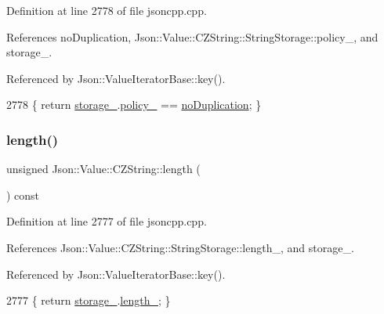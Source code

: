 Definition at line 2778 of file jsoncpp.\+cpp.



References no\+Duplication, Json\+::\+Value\+::\+C\+Z\+String\+::\+String\+Storage\+::policy\+\_\+, and storage\+\_\+.



Referenced by Json\+::\+Value\+Iterator\+Base\+::key().


\begin{DoxyCode}
2778 \{ \textcolor{keywordflow}{return} \hyperlink{class_json_1_1_value_1_1_c_z_string_a17c92f0f089a4314e3b1d5695dc1a851}{storage\_}.\hyperlink{struct_json_1_1_value_1_1_c_z_string_1_1_string_storage_a7f68c8d6197c5692a525854b5f29f87b}{policy\_} == \hyperlink{class_json_1_1_value_1_1_c_z_string_a2805c46fb4a72bbaed55de6d75941b6da08d540450fa6c4af57eaacf063eedd20}{noDuplication}; \}
\end{DoxyCode}
\mbox{\label{class_json_1_1_value_1_1_c_z_string_aa7ee665d162c1f33b3ec818e289d8a5e}} 
\subsubsection{\texorpdfstring{length()}{length()}}
{\footnotesize\ttfamily unsigned Json\+::\+Value\+::\+C\+Z\+String\+::length (\begin{DoxyParamCaption}{ }\end{DoxyParamCaption}) const}



Definition at line 2777 of file jsoncpp.\+cpp.



References Json\+::\+Value\+::\+C\+Z\+String\+::\+String\+Storage\+::length\+\_\+, and storage\+\_\+.



Referenced by Json\+::\+Value\+Iterator\+Base\+::key().


\begin{DoxyCode}
2777 \{ \textcolor{keywordflow}{return} \hyperlink{class_json_1_1_value_1_1_c_z_string_a17c92f0f089a4314e3b1d5695dc1a851}{storage\_}.\hyperlink{struct_json_1_1_value_1_1_c_z_string_1_1_string_storage_a165d865c44e6471d34668eeb4f15b140}{length\_}; \}
\end{DoxyCode}
\mbox{\label{class_json_1_1_value_1_1_c_z_string_ae023bb91b4b4520c82d5e6e4da8c310a}} 
